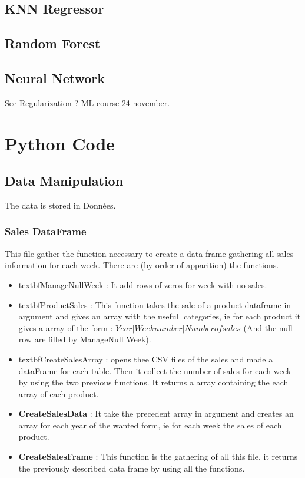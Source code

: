 \documentclass{report}
\begin{document}
\section{KNN Regressor}


\section{Random Forest}

\section{Neural Network}




See Regularization ? ML course 24 november.

\chapter{Python Code}

\section{Data Manipulation}
The data is stored in Données.\\

\subsection{Sales DataFrame}

This file gather the function necessary to create a data frame gathering all sales information for each week. There are (by order of apparition) the functions.

\begin{itemize}
\item textbf{ManageNullWeek} : It add rows of zeros for week with no sales.
\item textbf{ProductSales} : This function takes the sale of a product dataframe in argument and gives an array with the usefull categories, ie for each product it gives a array of the form : $Year | Week number  | Number of sales$ (And the null row are filled by ManageNull Week).
\item textbf{CreateSalesArray} : opens thee CSV files of the sales and made a dataFrame for each table. Then it collect the number of sales for each week by using the two previous functions. It returns a array containing the each array of each product.
\item \textbf{CreateSalesData} : It take the precedent array in argument and creates an array for each year of the wanted form, ie for each week the sales of each product.
\item \textbf{CreateSalesFrame} : This function is the gathering of all this file, it returns the previously described data frame by using all the functions.
\end{itemize}
\end{document}
